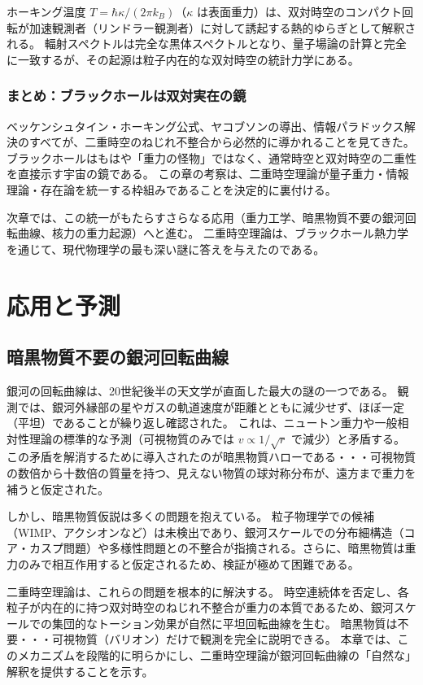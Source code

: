 \documentclass[dvipdfmx,a4paper]{jsbook}
\theoremstyle{definition}
\theoremstyle{remark}
\begin{document}
ホーキング温度 $T = \hbar \kappa / (2\pi k_B)$（$\kappa$ は表面重力）は、双対時空のコンパクト回転が加速観測者（リンドラー観測者）に対して誘起する熱的ゆらぎとして解釈される。
輻射スペクトルは完全な黒体スペクトルとなり、量子場論の計算と完全に一致するが、その起源は粒子内在的な双対時空の統計力学にある。

\section{まとめ：ブラックホールは双対実在の鏡}

ベッケンシュタイン・ホーキング公式、ヤコブソンの導出、情報パラドックス解決のすべてが、二重時空のねじれ不整合から必然的に導かれることを見てきた。
ブラックホールはもはや「重力の怪物」ではなく、通常時空と双対時空の二重性を直接示す宇宙の鏡である。
この章の考察は、二重時空理論が量子重力・情報理論・存在論を統一する枠組みであることを決定的に裏付ける。

次章では、この統一がもたらすさらなる応用（重力工学、暗黒物質不要の銀河回転曲線、核力の重力起源）へと進む。
二重時空理論は、ブラックホール熱力学を通じて、現代物理学の最も深い謎に答えを与えたのである。

\part{応用と予測}

\chapter{暗黒物質不要の銀河回転曲線}
\label{chap:flat-rotation-curves}

銀河の回転曲線は、20世紀後半の天文学が直面した最大の謎の一つである。  
観測では、銀河外縁部の星やガスの軌道速度が距離とともに減少せず、ほぼ一定（平坦）であることが繰り返し確認された。  
これは、ニュートン重力や一般相対性理論の標準的な予測（可視物質のみでは $v \propto 1/\sqrt{r}$ で減少）と矛盾する。  
この矛盾を解消するために導入されたのが暗黒物質ハローである・・・可視物質の数倍から十数倍の質量を持つ、見えない物質の球対称分布が、遠方まで重力を補うと仮定された。

しかし、暗黒物質仮説は多くの問題を抱えている。  
粒子物理学での候補（WIMP、アクシオンなど）は未検出であり、銀河スケールでの分布細構造（コア・カスプ問題）や多様性問題との不整合が指摘される。さらに、暗黒物質は重力のみで相互作用すると仮定されるため、検証が極めて困難である。

二重時空理論は、これらの問題を根本的に解決する。  
時空連続体を否定し、各粒子が内在的に持つ双対時空のねじれ不整合が重力の本質であるため、銀河スケールでの集団的なトーション効果が自然に平坦回転曲線を生む。  
暗黒物質は不要・・・可視物質（バリオン）だけで観測を完全に説明できる。  
本章では、このメカニズムを段階的に明らかにし、二重時空理論が銀河回転曲線の「自然な」解釈を提供することを示す。
\end{document}
